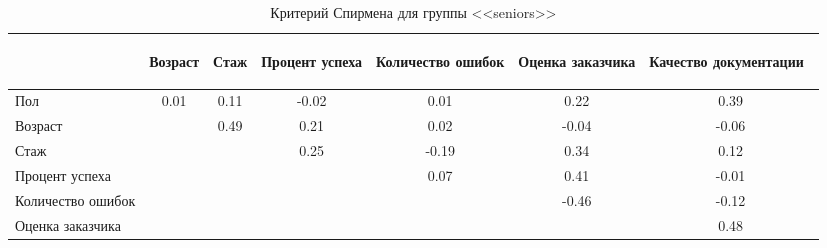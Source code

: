 \begin{table}[H]
	\centering
	\caption{Критерий Спирмена для группы <<seniors>>}
	\begin{tabular}{|l|c|c|c|c|c|c|}
		\hline
		&
		\begin{sideways}
			Возраст
		\end{sideways}  & 
		\begin{sideways}
			Стаж
		\end{sideways} & 
		\begin{sideways}
			Процент успеха
		\end{sideways} & 
		\begin{sideways}
			Количество ошибок
		\end{sideways} &
		\begin{sideways}
			Оценка заказчика
		\end{sideways} & 
		\begin{sideways}
			Качество документации~
		\end{sideways} \\ \hline
		Пол                   & 0.01 & 0.11 & -0.02 & 0.01  & 0.22 & 0.39 \\ \hline
		Возраст               && 0.49 & 0.21 & 0.02 & -0.04 & -0.06  \\ \hline	
		Стаж                  &&& 0.25 & -0.19 & 0.34 & 0.12  \\ \hline
		Процент успеха        &&&& 0.07 & 0.41 & -0.01  \\ \hline
		Количество ошибок     &&&&& -0.46 & -0.12  \\ \hline	
		Оценка заказчика      &&&&&& 0.48  \\ \hline
	\end{tabular}
	\label{sen/s}
\end{table}

